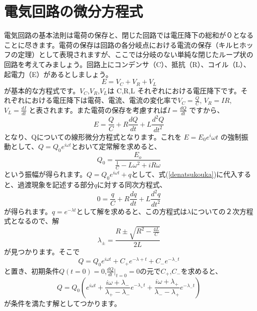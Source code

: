 \documentclass[a4paper]{jarticle}
\begin{document}
\rm
\section {電気回路の微分方程式}
電気回路の基本法則は電荷の保存と、閉じた回路では電圧降下の総和が０となることに尽きます。電荷の保存は回路の各分岐点における電流の保存（キルヒホッフの定理）として表現されますが、ここでは分岐のない単純な閉じたループ状の回路を考えてみましょう。回路上にコンデンサ（C）、抵抗（R）、コイル（L）、起電力（E）があるとしましょう。
\begin{equation}
  E = V_C + V_R + V_L
\end{equation}
が基本的な方程式です。$V_C$,$V_R$,$V_L$は C,R,L それぞれにおける電圧降下です。それぞれにおける電圧降下は電荷、電流、電流の変化率で$V_C = \frac {Q}{C}$, $V_R = IR$, $V_L = \frac {dI}{dt}$ と表されます。また電荷の保存を考慮すれば$I = \frac {dQ}{dt}$ ですから、
\begin{equation}
  E = \frac{Q}{C} + R\frac{dQ}{dt} + L\frac{d^2Q}{dt^2} \label{denatsukouka}
\end{equation}
となり、Qについての線形微分方程式となります。これを $E = E_0e^i\omega t$ の強制振動として、$Q = Q_0e^{i\omega t}$とおいて定常解を求めると、
\begin{displaymath}
  Q_0 = \frac{E_o}{\frac{1}{C} - L\omega ^2 + iR\omega}
\end{displaymath}
という振幅が得られます。$Q = Q_0e^{i\omega t} + q$として、式(\ref{denatsukouka})に代入すると、過渡現象を記述する部分$q$に対する同次方程式、
\begin{displaymath}
  0 = \frac{q}{C} + R\frac{dq}{dt} + L\frac{d^2q}{dt^2}
\end{displaymath}
が得られます。$q = e^{-\lambda t}$として解を求めると、この方程式は$\lambda$についての２次方程式となるので、解
\begin{displaymath}
  \lambda_\pm = \frac{R \pm \sqrt{R^2 - \frac{4L}{C}}}{2L}
\end{displaymath}
が見つかります。そこで
$$Q = Q_0e^{i\omega t} + C_+e^{-\lambda + t} + C_-e^{-\lambda_-t}$$
と置き、初期条件$Q(t = 0) = 0$,$\frac{dQ}{dt}|_{t=0} = 0$の元で$C_+$,$C_-$を求めると、
\begin{equation}
  Q = Q_0 (e^{i\omega t} + \frac{i\omega + \lambda_-}{\lambda_+ - \lambda_-}e^{-\lambda_+ t} + \frac{i\omega + \lambda_+}{\lambda_- - \lambda_+}e^{-\lambda_-t})
\end{equation}
が条件を満たす解としてつかります。
\end{document}
